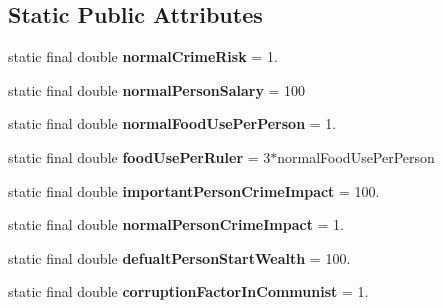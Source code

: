 \subsection*{Static Public Attributes}
\begin{DoxyCompactItemize}
\item 
static final double {\bfseries normal\+Crime\+Risk} = 1.\hypertarget{classuniverse_1_1_universal_constants_a10a86d66432cf1da31f56f56ce43ab8b}{}\label{classuniverse_1_1_universal_constants_a10a86d66432cf1da31f56f56ce43ab8b}

\item 
static final double {\bfseries normal\+Person\+Salary} = 100\hypertarget{classuniverse_1_1_universal_constants_a00b41fb0550eea625819b17a856ab8ac}{}\label{classuniverse_1_1_universal_constants_a00b41fb0550eea625819b17a856ab8ac}

\item 
static final double {\bfseries normal\+Food\+Use\+Per\+Person} = 1.\hypertarget{classuniverse_1_1_universal_constants_af1396461c9fd5b3a1ae975d364586751}{}\label{classuniverse_1_1_universal_constants_af1396461c9fd5b3a1ae975d364586751}

\item 
static final double {\bfseries food\+Use\+Per\+Ruler} = 3$\ast$normal\+Food\+Use\+Per\+Person\hypertarget{classuniverse_1_1_universal_constants_a3fc8decce7ab430101acea2116685d1c}{}\label{classuniverse_1_1_universal_constants_a3fc8decce7ab430101acea2116685d1c}

\item 
static final double {\bfseries important\+Person\+Crime\+Impact} = 100.\hypertarget{classuniverse_1_1_universal_constants_a5f5021222ecf197cebc783f62694aa3d}{}\label{classuniverse_1_1_universal_constants_a5f5021222ecf197cebc783f62694aa3d}

\item 
static final double {\bfseries normal\+Person\+Crime\+Impact} = 1.\hypertarget{classuniverse_1_1_universal_constants_a09aebb6fc03c976004ead09b2e50a728}{}\label{classuniverse_1_1_universal_constants_a09aebb6fc03c976004ead09b2e50a728}

\item 
static final double {\bfseries defualt\+Person\+Start\+Wealth} = 100.\hypertarget{classuniverse_1_1_universal_constants_a12bd69a72d5fd6afb9cf841367f66c00}{}\label{classuniverse_1_1_universal_constants_a12bd69a72d5fd6afb9cf841367f66c00}

\item 
static final double {\bfseries corruption\+Factor\+In\+Communist} = 1.\hypertarget{classuniverse_1_1_universal_constants_ac1b327004376ecff52e34ecd9cdee569}{}\label{classuniverse_1_1_universal_constants_ac1b327004376ecff52e34ecd9cdee569}


\end{DoxyCompactItemize}
